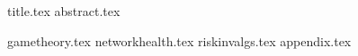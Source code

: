 \documentclass[11pt]{llncs}
\begin{document}
  {title.tex}
  \thispagestyle{plain}
  {abstract.tex}

  {gametheory.tex}
  {networkhealth.tex}
  {riskinvalgs.tex}
  {appendix.tex}
  
\end{document}
